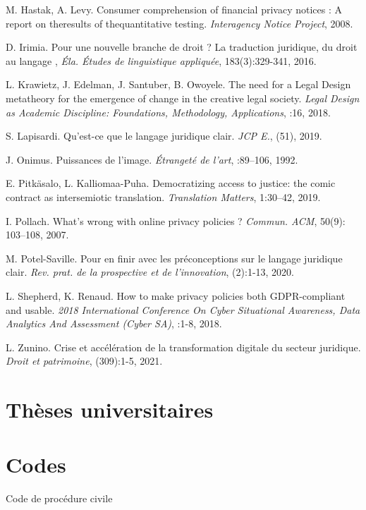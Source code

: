 M. Hastak, A. Levy. Consumer comprehension of financial privacy notices : A report on theresults of thequantitative testing. \emph{Interagency Notice Project}, 2008.\par{}

D. Irimia. Pour une nouvelle branche de droit ? La traduction juridique, du droit au langage , \emph{Éla. Études de linguistique appliquée}, 183(3):329-341, 2016.\par{}

L. Krawietz, J. Edelman, J. Santuber, B. Owoyele. The need for a Legal Design metatheory for the emergence of change in the creative legal society. \emph{Legal Design as Academic Discipline: Foundations, Methodology, Applications}, :16, 2018.\par{}

S. Lapisardi. Qu’est-ce que le langage juridique clair. \emph{JCP E.}, (51), 2019.\par{}

J. Onimus. Puissances de l’image. \emph{Étrangeté de l’art}, :89–106, 1992.

E. Pitkäsalo, L. Kalliomaa-Puha. Democratizing access to justice: the comic contract as intersemiotic translation. \emph{Translation Matters}, 1:30–42, 2019.\par{}

I. Pollach. What’s wrong with online privacy policies ? \emph{Commun. ACM}, 50(9): 103–108, 2007.

M. Potel-Saville. Pour en finir avec les préconceptions sur le langage juridique clair. \emph{Rev. prat. de la prospective et de l'innovation}, (2):1-13, 2020. 

L. Shepherd, K. Renaud. How to make privacy policies both GDPR-compliant and usable. \emph{2018 International Conference On Cyber Situational Awareness, Data Analytics And Assessment (Cyber SA)}, :1-8, 2018.\par{}

L. Zunino. Crise et accélération de la transformation digitale du secteur juridique. \emph{Droit et patrimoine}, (309):1-5, 2021.\par{}

\section*{Thèses universitaires}

\section*{Codes}
Code de procédure civile\par{}

